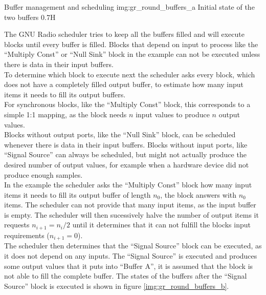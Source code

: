 \begin{subchapter}{Buffer management and scheduling}
               {img:gr_round_buffers_a}
               {Initial state of the two buffers}
               {0.7}{H}

  The GNU Radio scheduler tries to keep all the buffers filled
  and will execute blocks until every buffer is filled.
  Blocks that depend on input to process like the ``Multiply Const''
  or ``Null Sink'' block in the example can not be executed
  unless there is data in their input buffers. \\

  To determine which block to execute next the scheduler
  asks every block, which does not have a completely filled
  output buffer, to estimate how many input items it needs to fill
  its output buffers. \\

  For synchronous blocks, like the ``Multiply Const'' block,
  this corresponds to a simple 1:1 mapping, as the block
  needs $n$ input values to produce $n$ output values. \\

  Blocks without output ports, like the ``Null Sink'' block,
  can be scheduled whenever there is data in their input
  buffers.
  Blocks without input ports, like ``Signal Source'' can
  always be scheduled, but might not actually produce the
  desired number of output values, for example when a
  hardware device did not produce enough samples. \\

  In the example the scheduler asks the ``Multiply Const''
  block how many input items it needs to fill
  its output buffer of length $n_0$, the block answers with
  $n_0$ items.
  The scheduler can not provide that many input items,
  as the input buffer is empty.
  The scheduler will then sucessively halve the number
  of output items it requests $n_{i+1}=n_i/2$ until
  it determines that it can not fulfill the blocks
  input requirements ($n_{i+1}=0$). \\

  The scheduler then determines that the ``Signal Source''
  block can be executed, as it does not depend on any
  inputs.
  The ``Signal Source'' is executed and produces some
  output values that it puts into ``Buffer A'', it is assumed
  that the block is not able to fill the complete buffer.
  The states of the buffers after the ``Signal Source''
  block is executed is shown in figure \ref{img:gr_round_buffers_b}. \\


\end{subchapter}
